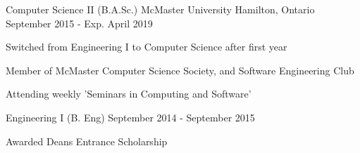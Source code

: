 

\begin{cventries}

  \cventry
    {Computer Science II (B.A.Sc.)} %
    {McMaster University} %
    {Hamilton, Ontario} %
    {September 2015 - Exp. April 2019} %
    {
      \begin{cvitems} %
        \item {Switched from Engineering I to Computer Science after first year}
        \item {Member of McMaster Computer Science Society, and Software Engineering Club}
        \item {Attending weekly 'Seminars in Computing and Software'}
      \end{cvitems}
    }

  \cventry
  {Engineering I (B. Eng)} %
    {} %
    {} %
    {September 2014 - September 2015} %
    {
      \begin{cvitems} %
        \item {Awarded Deans Entrance Scholarship}
      \end{cvitems}
    }
\end{cventries}
